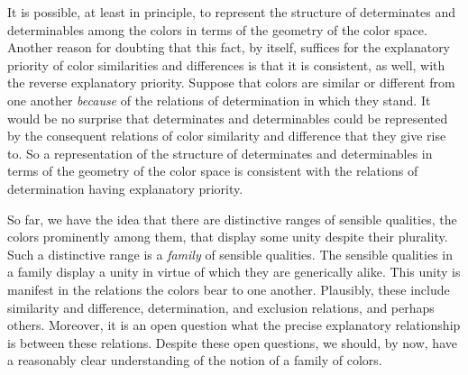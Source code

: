 \documentclass[12pt]{article}
\begin{document}
It is possible, at least in principle, to represent the structure of determinates and determinables among the colors in terms of the geometry of the color space. Another reason for doubting that this fact, by itself, suffices for the explanatory priority of color similarities and differences is that it is consistent, as well, with the reverse explanatory priority. Suppose that colors are similar or different from one another \emph{because} of the relations of determination in which they stand. It would be no surprise that determinates and determinables could be represented by the consequent relations of color similarity and difference that they give rise to. So a representation of the structure of determinates and determinables in terms of the geometry of the color space is consistent with the relations of determination having explanatory priority.

So far, we have the idea that there are distinctive ranges of sensible qualities, the colors prominently among them, that display some unity despite their plurality. Such a distinctive range is a \emph{family} of sensible qualities. The sensible qualities in a family display a unity in virtue of which they are generically alike. This unity is manifest in the relations the colors bear to one another. Plausibly, these include similarity and difference, determination, and exclusion relations, and perhaps others. Moreover, it is an open question what the precise explanatory relationship is between these relations. Despite these open questions, we should, by now, have a reasonably clear understanding of the notion of a family of colors.
\end{document}
